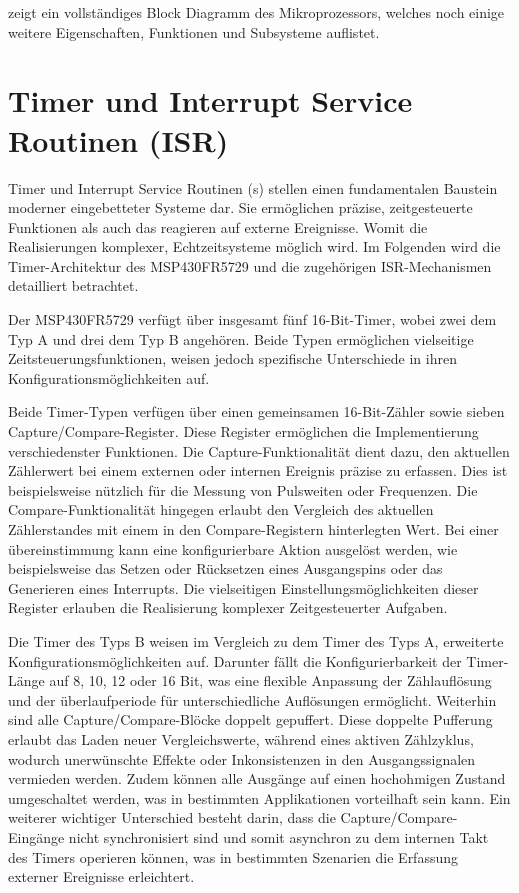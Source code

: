 \newpage
{} zeigt ein vollst\"andiges Block Diagramm des Mikroprozessors, welches noch einige weitere Eigenschaften, Funktionen und Subsysteme auflistet. \AI


\section{Timer und Interrupt Service Routinen (ISR)}
\label{TIMER&ISR}

Timer und Interrupt Service Routinen (s) stellen einen fundamentalen Baustein moderner eingebetteter Systeme dar. Sie erm\"oglichen pr\"azise, zeitgesteuerte Funktionen als auch das reagieren auf externe Ereignisse. Womit die Realisierungen komplexer, Echtzeitsysteme m\"oglich wird. Im Folgenden wird die Timer-Architektur des MSP430FR5729 und die zugeh\"origen ISR-Mechanismen detailliert betrachtet.

Der MSP430FR5729 verf\"ugt \"uber insgesamt f\"unf 16-Bit-Timer, wobei zwei dem Typ A und drei dem Typ B angeh\"oren. Beide Typen erm\"oglichen vielseitige Zeitsteuerungsfunktionen, weisen jedoch spezifische Unterschiede in ihren Konfigurationsm\"oglichkeiten auf.

Beide Timer-Typen verf\"ugen \"uber einen gemeinsamen 16-Bit-Z\"ahler sowie sieben Capture/Compare-Register. Diese Register erm\"oglichen die Implementierung verschiedenster Funktionen. Die Capture-Funktionalit\"at dient dazu, den aktuellen Z\"ahlerwert bei einem externen oder internen Ereignis pr\"azise zu erfassen. Dies ist beispielsweise n\"utzlich f\"ur die Messung von Pulsweiten oder Frequenzen. Die Compare-Funktionalit\"at hingegen erlaubt den Vergleich des aktuellen Z\"ahlerstandes mit einem in den Compare-Registern hinterlegten Wert. Bei einer \"ubereinstimmung kann eine konfigurierbare Aktion ausgel\"ost werden, wie beispielsweise das Setzen oder R\"ucksetzen eines Ausgangspins oder das Generieren eines Interrupts. Die vielseitigen Einstellungsm\"oglichkeiten dieser Register erlauben die Realisierung komplexer Zeitgesteuerter Aufgaben. 

Die Timer des Typs B weisen im Vergleich zu dem Timer des Typs A, erweiterte Konfigurationsm\"oglichkeiten auf. Darunter f\"allt die Konfigurierbarkeit der Timer-L\"ange auf 8, 10, 12 oder 16 Bit, was eine flexible Anpassung der Z\"ahlaufl\"osung und der \"uberlaufperiode f\"ur unterschiedliche Aufl\"osungen erm\"oglicht. Weiterhin sind alle Capture/Compare-Bl\"ocke doppelt gepuffert. Diese doppelte Pufferung erlaubt das Laden neuer Vergleichswerte, w\"ahrend eines aktiven Z\"ahlzyklus, wodurch unerw\"unschte Effekte oder Inkonsistenzen in den Ausgangssignalen vermieden werden. Zudem k\"onnen alle Ausg\"ange auf einen hochohmigen Zustand umgeschaltet werden, was in bestimmten Applikationen vorteilhaft sein kann. Ein weiterer wichtiger Unterschied besteht darin, dass die Capture/Compare-Eing\"ange nicht synchronisiert sind und somit asynchron zu dem internen Takt des Timers operieren k\"onnen, was in bestimmten Szenarien die Erfassung externer Ereignisse erleichtert. 

